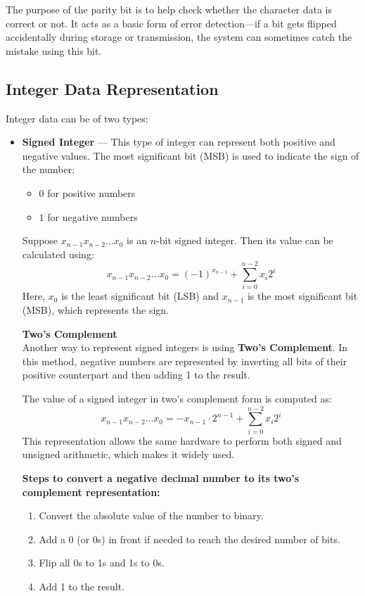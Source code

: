 \documentclass[12pt]{book}
\begin{document}
The purpose of the parity bit is to help check whether the character data is correct or not. It acts as a basic form of error detection—if a bit gets flipped accidentally during storage or transmission, the system can sometimes catch the mistake using this bit.

\subsection{Integer Data Representation} \label{subsec:integer-data}

Integer data can be of two types:
\begin{itemize}
    \item \textbf{Signed Integer} — This type of integer can represent both positive and negative values. The most significant bit (MSB) is used to indicate the sign of the number:
    \begin{itemize}
        \item $0$ for positive numbers
        \item $1$ for negative numbers
    \end{itemize}
    
    Suppose $x_{n-1}x_{n-2}\ldots x_0$ is an $n$-bit signed integer. Then its value can be calculated using:
    \begin{equation} \label{eq:signed-magnitude}
        x_{n-1}x_{n-2}\ldots x_0 = (-1)^{x_{n-1}} + \sum_{i=0}^{n-2} x_i 2^i
    \end{equation}
    Here, $x_0$ is the least significant bit (LSB) and $x_{n-1}$ is the most significant bit (MSB), which represents the sign.

    \medskip
    \textbf{Two's Complement}\\
    Another way to represent signed integers is using \textbf{Two's Complement}. In this method, negative numbers are represented by inverting all bits of their positive counterpart and then adding 1 to the result.

    The value of a signed integer in two's complement form is computed as:
    \begin{equation} \label{eq:twos-complement}
        x_{n-1}x_{n-2}\ldots x_0 = -x_{n-1} \cdot 2^{n-1} + \sum_{i=0}^{n-2} x_i 2^i
    \end{equation}
    This representation allows the same hardware to perform both signed and unsigned arithmetic, which makes it widely used.

    \begin{example}
        \textbf{Steps to convert a negative decimal number to its two's complement representation:}
        \begin{enumerate}
            \item Convert the absolute value of the number to binary.
            \item Add a 0 (or 0s) in front if needed to reach the desired number of bits.
            \item Flip all 0s to 1s and 1s to 0s.
            \item Add 1 to the result.
        \end{enumerate}


\end{example}
\end{itemize}
\end{document}
